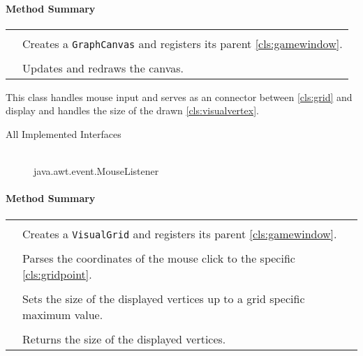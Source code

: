\centerdash

\paragraph*{Method Summary}
\paragraph*{}
\begin{longtable}{Lp{10cm}}
	\startmethodtable
	 \\
	& Creates a \texttt{GraphCanvas} and registers its parent \ref{cls:gamewindow}. \\
	 \\
	& Updates and redraws the canvas. \\ 
	\hline
\end{longtable}

This class handles mouse input and serves as an connector between \ref{cls:grid} and display and handles the size of the drawn \ref{cls:visualvertex}. \\ 
\begin{description}
	\item[All Implemented Interfaces] \hfill \\
	java.awt.event.MouseListener
\end{description}
\centerdash

\paragraph*{Method Summary}
\paragraph*{}
\begin{longtable}{Lp{10cm}}
	\startmethodtable
	 \\
	& Creates a \texttt{VisualGrid} and registers its parent \ref{cls:gamewindow}. \\
	 \\
	& Parses the coordinates of the mouse click to the specific \ref{cls:gridpoint}. \\
	 \\
	& Sets the size of the displayed vertices up to a grid specific maximum value. \\
	 \\
	& Returns the size of the displayed vertices. \\ 
	\hline
\end{longtable}

